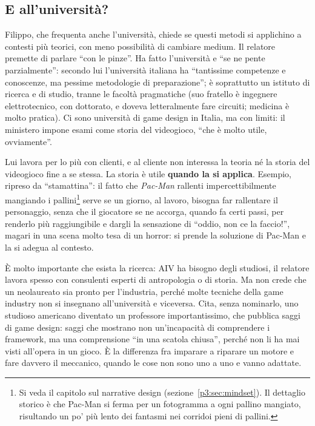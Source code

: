 \subsection{E all'università?}

Filippo, che frequenta anche l'università, chiede se questi metodi si
applichino a contesti più teorici, con meno possibilità di cambiare medium.
Il relatore premette di parlare ``con le pinze''. Ha fatto l'università e
``se ne pente parzialmente'': secondo lui l'università italiana ha
``tantissime competenze e conoscenze, ma pessime metodologie di
preparazione''; è soprattutto un istituto di ricerca e di studio, tranne le
facoltà pragmatiche (suo fratello è ingegnere elettrotecnico, con dottorato,
e doveva letteralmente fare circuiti; medicina è molto pratica). Ci sono
università di game design in Italia, ma con limiti: il ministero impone
esami come storia del videogioco, ``che è molto utile, ovviamente''.

Lui lavora per lo più con clienti, e al cliente non interessa la teoria né la
storia del videogioco fine a se stessa. La storia è utile \textbf{quando la si
applica}. Esempio, ripreso da ``stamattina'': il fatto che \emph{Pac-Man}
rallenti impercettibilmente mangiando i pallini\footnote{Si veda il
capitolo sul narrative design (sezione~\ref{p3:sec:mindset}). Il dettaglio
storico è che Pac-Man si ferma per un fotogramma a ogni pallino mangiato,
risultando un po' più lento dei fantasmi nei corridoi pieni di pallini.}
serve se un giorno, al lavoro, bisogna far rallentare il personaggio, senza
che il giocatore se ne accorga, quando fa certi passi, per renderlo più
raggiungibile e dargli la sensazione di ``oddio, non ce la faccio!'', magari
in una scena molto tesa di un horror: si prende la soluzione di Pac-Man e la
si adegua al contesto.

È molto importante che esista la ricerca: AIV ha bisogno degli studiosi,
il relatore lavora spesso con consulenti esperti di antropologia o di
storia. Ma non crede che un neolaureato sia pronto per l'industria, perché
molte tecniche della game industry non si insegnano all'università e
viceversa. Cita, senza nominarlo, uno studioso americano diventato un
professore importantissimo, che pubblica saggi di game design: saggi che
mostrano non un'incapacità di comprendere i framework, ma una comprensione
``in una scatola chiusa'', perché non li ha mai visti all'opera in un gioco.
È la differenza fra imparare a riparare un motore e fare davvero il
meccanico, quando le cose non sono uno a uno e vanno adattate.

